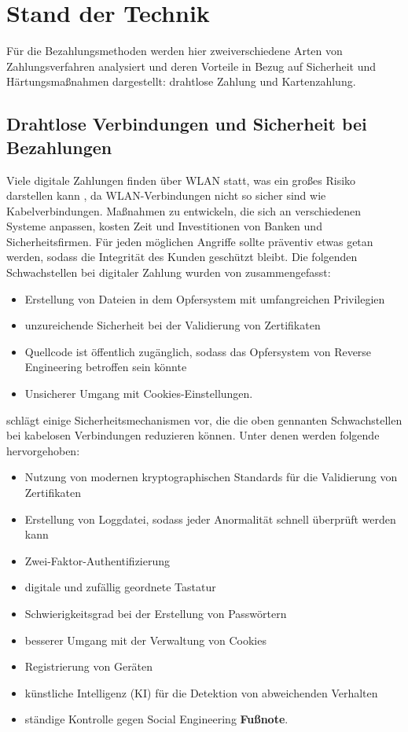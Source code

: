 \section{Stand der Technik}

Für die Bezahlungsmethoden werden hier zweiverschiedene Arten von Zahlungsverfahren analysiert und deren
Vorteile in Bezug auf Sicherheit und Härtungsmaßnahmen dargestellt: drahtlose Zahlung und Kartenzahlung.

\subsection{Drahtlose Verbindungen und Sicherheit bei Bezahlungen}

Viele digitale Zahlungen finden über WLAN statt, was ein großes Risiko darstellen kann \cite{refip:NYRS}, 
da WLAN-Verbindungen nicht so sicher sind wie Kabelverbindungen. Maßnahmen zu entwickeln, die sich an 
verschiedenen Systeme anpassen, kosten Zeit und Investitionen von Banken und Sicherheitsfirmen. 
Für jeden möglichen Angriffe sollte präventiv etwas getan werden, sodass die Integrität des Kunden 
geschützt bleibt. Die folgenden Schwachstellen bei digitaler Zahlung wurden von \cite{refip:NYRS}
zusammengefasst:

\begin{itemize}
    \item Erstellung von Dateien in dem Opfersystem mit umfangreichen Privilegien
    \item unzureichende Sicherheit bei der Validierung von Zertifikaten
    \item Quellcode ist öffentlich zugänglich, sodass das Opfersystem von Reverse
    Engineering betroffen sein könnte
    \item Unsicherer Umgang mit Cookies-Einstellungen.
\end{itemize}

\cite{refip:NYRS} schlägt einige Sicherheitsmechanismen vor, die die oben gennanten Schwachstellen bei 
kabelosen Verbindungen reduzieren können. Unter denen werden folgende hervorgehoben: 


\begin{itemize}
    \item Nutzung von modernen kryptographischen Standards für die Validierung von Zertifikaten
    \item Erstellung von Loggdatei, sodass jeder Anormalität schnell überprüft werden kann
    \item Zwei-Faktor-Authentifizierung
    \item digitale und zufällig geordnete Tastatur
    \item Schwierigkeitsgrad bei der Erstellung von Passwörtern
    \item besserer Umgang mit der Verwaltung von Cookies
    \item Registrierung von Geräten
    \item künstliche Intelligenz (KI) für die Detektion von abweichenden Verhalten
    \item ständige Kontrolle gegen Social Engineering \textbf{Fußnote}.
\end{itemize}


